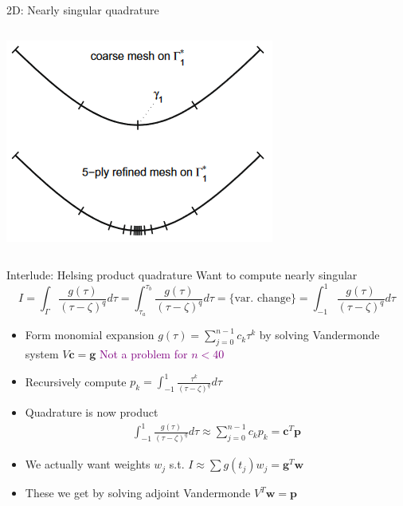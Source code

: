 \documentclass[t]{beamer}
\newcommand{\com}[1]{{\scriptsize \textcolor{purple}{#1}}}      %
\begin{document}
\begin{frame}{2D: Nearly singular quadrature}
\begin{center}
\begin{columns}[c]
\begin{column}{0.5\textwidth}
        \includegraphics[width=\textwidth]{fig/refinement}        
      \end{column}
    \end{columns}
  \end{center}  
\end{frame}

\begin{noframe}{Interlude: Helsing product quadrature}
  Want to compute nearly singular
  $$
  I = \int_\Gamma \frac{g(\tau)}{(\tau-\zeta)^q} d\tau
  =
  \int_{\tau_a}^{\tau_b} \frac{g(\tau)}{(\tau-\zeta)^q} d\tau
  = \text{\{var. change\}} = 
  \int_{-1}^{1} \frac{g(\tau)}{(\tau-\zeta)^q} d\tau
  $$
  \pause
  \begin{itemize}
  \item Form monomial expansion
    $
    g(\tau) = \sum_{j=0}^{n-1} c_k \tau^k $
    by solving Vandermonde system $V\bm{c} = \bm g$ \hfill \com{Not a problem for $n < 40$}
    \pause
  \item Recursively compute $p_k = \int_{-1}^{1} \frac{\tau^k}{(\tau-\zeta)^q} d\tau$
    \pause
  \item Quadrature is now product
    \begin{align}
      \int_{-1}^{1} \frac{g(\tau)}{(\tau-\zeta)^q} d\tau \approx \sum_{j=0}^{n-1} c_k p_k = \bm{c}^T\bm{p} 
    \end{align}
    \pause
  \item We actually want weights $w_j$ s.t. $I \approx \sum g(t_j) w_j = \bm{g}^T \bm{w}$
  \item These we get by solving adjoint Vandermonde $V^T\bm{w} = \bm p$
  \end{itemize}
  
  
\end{noframe}
\end{document}
